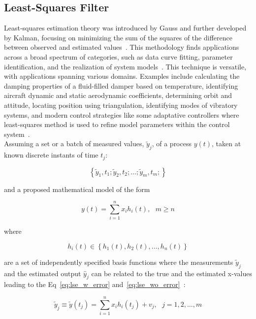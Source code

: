 \subsection{Least-Squares Filter}
Least-squares estimation theory was introduced by Gauss and further developed by Kalman, focusing on minimizing the sum of the squares of the difference between observed and estimated values~\cite{sorenson1970lse}. This methodology finds applications across a broad spectrum of categories, such as data curve fitting, parameter identification, and the realization of system models~\cite{crassidis2004dynamic}. This technique is versatile, with applications spanning various domains. Examples include calculating the damping properties of a fluid-filled damper based on temperature, identifying aircraft dynamic and static aerodynamic coefficients, determining orbit and attitude, locating position using triangulation, identifying modes of vibratory systems, and modern control strategies like some adaptative controllers where least-squares method is used to refine model parameters within the control system~\cite{crassidis2004dynamic}. \\

Assuming a set or a batch of measured values, $\tilde{y}_{j}$, of a process $y(t)$, taken at known discrete instants of time $t_{j}$:

\begin{equation}
    \left\{\tilde{y}_{1}, t_{1}; \tilde{y}_{2}, t_{2}; \ldots; \tilde{y}_{m}, t_{m}; \right\}
\end{equation}

and a proposed mathematical model of the form

\begin{equation}
    y(t) = \sum_{i = 1}^{n}{x_{i} h_{i}(t)},~~~m \geq n
\end{equation}

where

\begin{equation}
    h_{i}(t) \in \left\{ h_{1}(t), h_{2}(t), \ldots, h_{n}(t) \right\}
\end{equation}

are a set of independently specified basis functions where the measurements $\tilde{y}_{j}$ and the estimated output $\hat{y}_{j}$ can be related to the true and the estimated x-values leading to the Eq~\ref{eq:lse_w_error} and~\ref{eq:lse_wo_error}~\cite{crassidis2004dynamic}:

\begin{equation}
    \tilde{y}_{j} \equiv \tilde{y}(t_{j}) = \sum_{i = 1}^{n}{x_{i} h_{i}(t_{j}) + v_{j}},~~~j = 1, 2, \ldots, m
    \label{eq:lse_w_error}
\end{equation}

